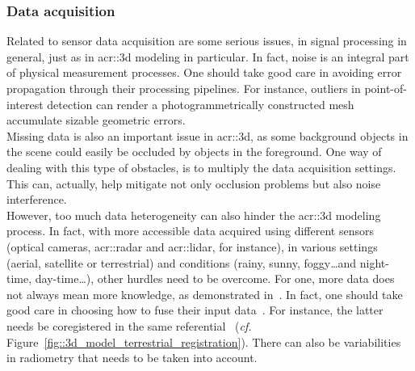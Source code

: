         \subsubsection{Data acquisition}
            Related to sensor data acquisition are some serious issues, in signal processing in general, just as in \gls{acr::3d} modeling in particular.
            In fact, noise is an integral part of physical measurement processes.
            One should take good care in avoiding error propagation through their processing pipelines.
            For instance, outliers in point-of-interest detection can render a photogrammetrically constructed mesh accumulate sizable geometric errors.\\
            Missing data is also an important issue in \gls{acr::3d}, as some background objects in the scene could easily be occluded by objects in the foreground.
            One way of dealing with this type of obstacles, is to multiply the data acquisition settings.
            This can, actually, help mitigate not only occlusion problems but also noise interference.\\
            However, too much data heterogeneity can also hinder the \gls{acr::3d} modeling process.
            In fact, with more accessible data acquired using different sensors (optical cameras, \gls{acr::radar} and \gls{acr::lidar}, for instance), in various settings (aerial, satellite or terrestrial) and conditions (rainy, sunny, foggy\dots and night-time, day-time\dots), other hurdles need to be overcome.
            For one, more data does not always mean more knowledge, as demonstrated in~\textcite{brachmann2018learning}.
            In fact, one should take good care in choosing how to fuse their input data~\parencite{kedzierski2014terrestrial}.
            For instance, the latter needs be coregistered in the same referential~\parencite{monnier2013registration, mezian2016uncertainty} (\textit{cf.} Figure~\ref{fig::3d_model_terrestrial_registration}).
            There can also be variabilities in radiometry that needs to be taken into account.\addref
